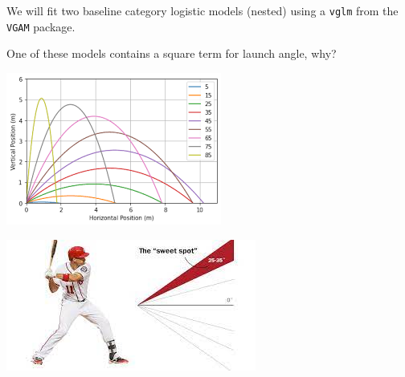 \documentclass[
  ignorenonframetext,
]{beamer}
\begin{document}
\begin{frame}{}
\protect\hypertarget{section-5}{}
We will fit two baseline category logistic models (nested) using a
\texttt{vglm} from the \texttt{VGAM} package.

\vspace{12pt}

One of these models contains a square term for launch angle, why?
\end{frame}

\begin{frame}{}
\protect\hypertarget{section-6}{}
\includegraphics{la_var.png}
\end{frame}

\begin{frame}{}
\protect\hypertarget{section-7}{}
\includegraphics{la_sweet.jpg}
\end{frame}
\end{document}
